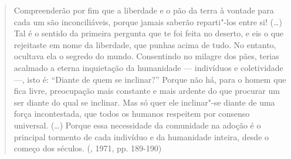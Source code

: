 \begin{quote}
Compreenderão por fim que a liberdade e o pão da terra à vontade para
cada um são inconciliáveis, porque jamais saberão reparti"-los entre si!
(\ldots) Tal é o sentido da primeira pergunta que te foi feita no deserto,
e eis o que rejeitaste em nome da liberdade, que punhas acima de tudo.
No entanto, ocultava ela o segredo do mundo. Consentindo no milagre dos
pães, terias acalmado a eterna inquietação da humanidade --- indivíduos e
coletividade ---, isto é: ``Diante de quem se inclinar?'' Porque não há,
para o homem que fica livre, preocupação mais constante e mais ardente
do que procurar um ser diante do qual se inclinar. Mas só quer ele
inclinar"-se diante de uma força incontestada, que todos os humanos
respeitem por consenso universal. (\ldots) Porque essa necessidade da
comunidade na adoção é o principal tormento de cada indivíduo e da
humanidade inteira, desde o começo dos séculos. (, 1971, pp.
189-190)
\end{quote}

